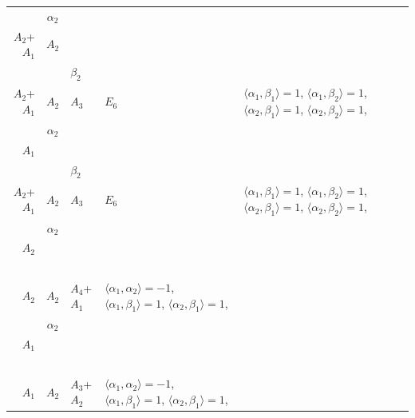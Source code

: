 \documentclass[12pt]{report}
\begin{document}
\begin{appendix}
{\begin{longtable}{rcl p{1cm}p{1cm}p{3cm} }
\begin{tabular}{cc}$\alpha_1$+ & $\alpha_2$\\\tiny{ $A_2$+$A_1$ } & \tiny{ $A_2$ }\end{tabular} &\begin{tabular}{c} = \\~ \end{tabular} & \begin{tabular}{cc}$\beta_1$+ & $\beta_2$\\\tiny{ $A_2$+$A_1$ } & \tiny{ $A_2$ }\end{tabular} & $A_3$ & $E_6$ &  $\langle\alpha_1, \beta_1\rangle=1$, $\langle\alpha_1, \beta_2\rangle=1$, $\langle\alpha_2, \beta_1\rangle=1$, $\langle\alpha_2, \beta_2\rangle=1$, 
\\
\begin{tabular}{cc}$\alpha_1$+ & $\alpha_2$\\\tiny{ $A_1$ } & \tiny{  }\end{tabular} &\begin{tabular}{c} = \\~ \end{tabular} & \begin{tabular}{cc}$\beta_1$+ & $\beta_2$\\\tiny{ $A_2$+$A_1$ } & \tiny{ $A_2$ }\end{tabular} & $A_3$ & $E_6$ &  $\langle\alpha_1, \beta_1\rangle=1$, $\langle\alpha_1, \beta_2\rangle=1$, $\langle\alpha_2, \beta_1\rangle=1$, $\langle\alpha_2, \beta_2\rangle=1$, 
\\
\begin{tabular}{cc}$\alpha_1$+ & $\alpha_2$\\\tiny{ $A_2$ } & \tiny{  }\end{tabular} &\begin{tabular}{c} = \\~ \end{tabular} & \begin{tabular}{c}$\beta_1$\\\tiny{ $A_2$ }\end{tabular} & $A_2$ & $A_4$+$A_1$ & $\langle\alpha_1, \alpha_2\rangle=-1$,  $\langle\alpha_1, \beta_1\rangle=1$, $\langle\alpha_2, \beta_1\rangle=1$, 
\\
\begin{tabular}{cc}$\alpha_1$+ & $\alpha_2$\\\tiny{ $A_1$ } & \tiny{  }\end{tabular} &\begin{tabular}{c} = \\~ \end{tabular} & \begin{tabular}{c}$\beta_1$\\\tiny{ $A_1$ }\end{tabular} & $A_2$ & $A_3$+$A_2$ & $\langle\alpha_1, \alpha_2\rangle=-1$,  $\langle\alpha_1, \beta_1\rangle=1$, $\langle\alpha_2, \beta_1\rangle=1$, 

\end{longtable}}
\end{appendix}
\end{document}
